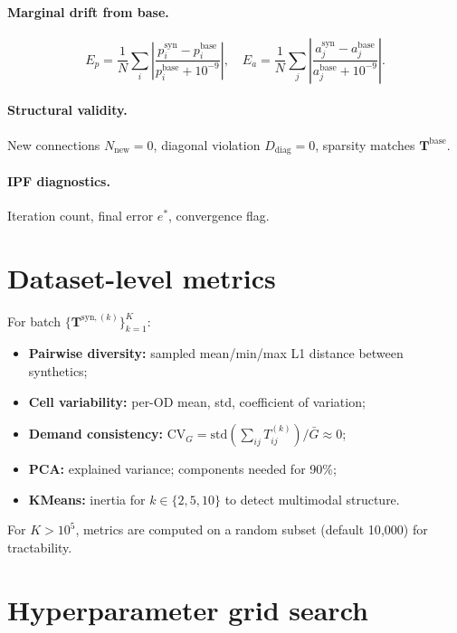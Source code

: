 \documentclass[11pt,a4paper]{report}
\newcommand{\Tbase}{\mathbf{T}^{\mathrm{base}}}
\newcommand{\Tsynk}[1]{\mathbf{T}^{\mathrm{syn},(#1)}}
\begin{document}
\paragraph{Marginal drift from base.}
\begin{equation}
    E_p = \frac{1}{N}\sum_i\left|\frac{p_i^{\mathrm{syn}}-p_i^{\mathrm{base}}}{p_i^{\mathrm{base}}+10^{-9}}\right|,
    \quad
    E_a = \frac{1}{N}\sum_j\left|\frac{a_j^{\mathrm{syn}}-a_j^{\mathrm{base}}}{a_j^{\mathrm{base}}+10^{-9}}\right|.
\end{equation}

\paragraph{Structural validity.}
New connections $N_{\mathrm{new}}=0$, diagonal violation $D_{\mathrm{diag}}=0$, sparsity matches $\Tbase$.

\paragraph{IPF diagnostics.}
Iteration count, final error $e^*$, convergence flag.

\section{Dataset-level metrics}

For batch $\{\Tsynk{k}\}_{k=1}^{K}$:
\begin{itemize}[noitemsep]
    \item \textbf{Pairwise diversity:} sampled mean/min/max L1 distance between synthetics;
    \item \textbf{Cell variability:} per-OD mean, std, coefficient of variation;
    \item \textbf{Demand consistency:} $\mathrm{CV}_G=\mathrm{std}(\sum_{ij}T^{(k)}_{ij})/\bar{G}\approx 0$;
    \item \textbf{PCA:} explained variance; components needed for 90\%;
    \item \textbf{KMeans:} inertia for $k\in\{2,5,10\}$ to detect multimodal structure.
\end{itemize}
For $K>10^5$, metrics are computed on a random subset (default 10{,}000) for tractability.

\section{Hyperparameter grid search}
\end{document}
